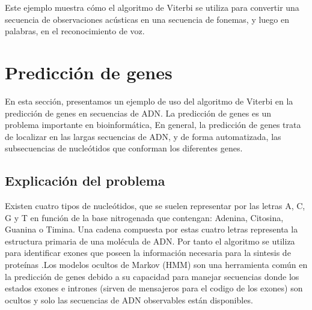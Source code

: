 \documentclass[11pt,openany]{book}
\begin{document}
Este ejemplo muestra cómo el algoritmo de Viterbi se utiliza para convertir una secuencia de observaciones acústicas en una secuencia de fonemas, y luego en palabras, en el reconocimiento de voz.

\section{Predicción de genes}

En esta sección, presentamos un ejemplo de uso del algoritmo de Viterbi en la predicción de genes en secuencias de ADN. La predicción de genes es un problema importante en bioinformática,
En general, la predicción de genes trata de localizar en las largas secuencias de ADN, y de forma automatizada, las subsecuencias de nucleótidos que conforman los diferentes genes.
\subsection*{Explicación del problema}
Existen cuatro tipos de nucleótidos, que se suelen representar por las letras A, C, G y T en función de la base nitrogenada
que contengan: Adenina, Citosina, Guanina o Timina. Una cadena compuesta por estas cuatro letras representa la estructura primaria de una molécula de ADN.
Por tanto el algoritmo se utiliza para identificar exones que poseen la información necesaria para la sintesis 
de proteínas .Los modelos ocultos de Markov (HMM) son una herramienta común en la predicción de genes debido a su capacidad para manejar secuencias donde los estados exones e intrones (sirven de mensajeros para el codigo de los exones) 
son ocultos y solo las secuencias de ADN observables están disponibles. 
\end{document}
